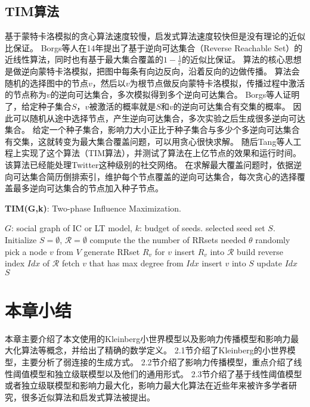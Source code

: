 \subsection{TIM算法}
基于蒙特卡洛模拟的贪心算法速度较慢，启发式算法速度较快但是没有理论的近似比保证。
Borgs等人\cite{borgs2014rrset}在14年提出了基于逆向可达集合（Reverse Reachable Set）的近线性算法，同时也有基于最大集合覆盖的$1-\frac{1}{e}$的近似比保证。
算法的核心思想是做逆向蒙特卡洛模拟，把图中每条有向边反向，沿着反向的边做传播。
算法会随机的选择图中的节点$v$，然后以$v$为根节点做反向蒙特卡洛模拟，传播过程中激活的节点称为$v$的逆向可达集合，多次模拟得到多个逆向可达集合。
Borgs等人证明了，给定种子集合$S$，$v$被激活的概率就是$S$和$v$的逆向可达集合有交集的概率。
因此可以随机从途中选择节点，产生逆向可达集合，多次实验之后生成很多逆向可达集合。
给定一个种子集合，影响力大小正比于种子集合与多少个多逆向可达集合有交集，这就转变为最大集合覆盖问题，可以用贪心很快求解。
随后Tang等人\cite{tang2014newrrset}工程上实现了这个算法（TIM算法），并测试了算法在上亿节点的效果和运行时间。该算法已经能处理Twitter这种级别的社交网络。
在求解最大覆盖问题时，依据逆向可达集合简历倒排索引，维护每个节点覆盖的逆向可达集合，每次贪心的选择覆盖最多逆向可达集合的节点加入种子节点。

\begin{algorithm}[h]
	\caption{\textbf{TIM(G,k)}: Two-phase Influence Maximization.}
	\label{alg:tim} 
	\begin{algorithmic}[1]
		\Require $G$: social graph of IC or LT model, $k$: budget of seeds.
		\Ensure selected seed set $S$.
		\State Initialize $S = \emptyset$, $\mathcal{R} = \emptyset$
		\State compute the the number of RRsets needed $\theta$
			\State randomly pick a node $v$ from $V$
			\State generate RRset $R_v$ for $v$
			\State insert $R_v$ into $\mathcal{R}$
		\EndFor
		\State build reverse index $Idx$ of $\mathcal{R}$
			\State fetch $v$ that has max degree from $Idx$
			\State insert $v$ into $S$
			\State update $Idx$
		\EndFor
		\State \Return $S$
	\end{algorithmic} 
\end{algorithm}

\section{本章小结}
本章主要介绍了本文使用的Kleinberg小世界模型以及影响力传播模型和影响力最大化算法等概念，并给出了精确的数学定义。
2.1节介绍了Kleinberg的小世界模型，主要分析了弱连接的生成方式。
2.2节介绍了影响力传播模型，重点介绍了线性阈值模型和独立级联模型以及他们的通用形式。
2.3节介绍了基于线性阈值模型或者独立级联模型和影响力最大化，影响力最大化算法在近些年来被许多学者研究，很多近似算法和启发式算法被提出。


